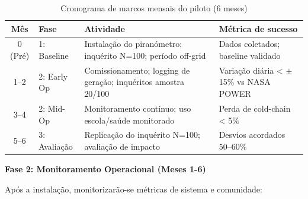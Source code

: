 \documentclass[12pt, a4paper]{article}
\begin{document}
\begin{table}[H]
\centering
\caption{Cronograma de marcos mensais do piloto (6 meses)}
\label{tab:validation_timeline}
\begin{tabular}{|c|l|p{7cm}|p{3.5cm}|}
\hline
\textbf{Mês} & \textbf{Fase} & \textbf{Atividade} & \textbf{Métrica de sucesso} \\
\hline
0 (Pré) & 1: Baseline & Instalação do piranómetro; inquérito N=100; período off-grid & Dados coletados; baseline validado \\
\hline
1--2 & 2: Early Op & Comissionamento; logging de geração; inquéritos amostra 20/100 & Variação diária < $\pm$15\% vs NASA POWER \\
\hline
3--4 & 2: Mid-Op & Monitoramento contínuo; uso escola/saúde monitorado & Perda de cold-chain < 5\% \\
\hline
5--6 & 3: Avaliação & Replicação do inquérito N=100; avaliação de impacto & Desvios acordados 50--60\% \\
\hline
\end{tabular}
\end{table}

\begin{center}
\end{center}

\textbf{Fase 2: Monitoramento Operacional (Meses 1-6)}

Após a instalação, monitorizarão-se métricas de sistema e comunidade:
\end{document}
